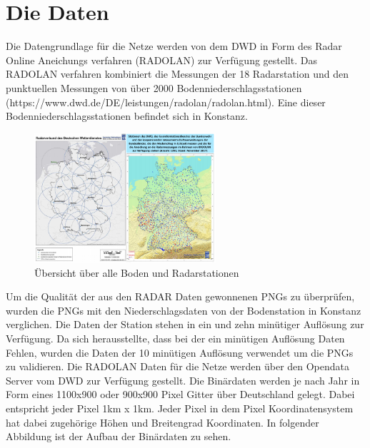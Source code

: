 \section{Die Daten}\label{die daten}
Die Datengrundlage für die Netze werden von dem DWD in Form des Radar Online Aneichungs verfahren (RADOLAN) zur Verfügung gestellt. Das RADOLAN verfahren kombiniert die Messungen der 18 Radarstation und den punktuellen Messungen von über 2000 Bodenniederschlagsstationen (https://www.dwd.de/DE/leistungen/radolan/radolan.html). Eine dieser Bodenniederschlagsstationen befindet sich in Konstanz. 

\begin{figure}[htb]
 \centering
 \includegraphics[width=0.6\textwidth,angle=0]{abb/daten_stationsuebersicht}
 \caption[Stationen Übersicht]{Übersicht über alle Boden und Radarstationen}
\label{fig:daten_stationsuebersicht}
\end{figure}

Um die Qualität der aus den RADAR Daten gewonnenen PNGs zu überprüfen, wurden die PNGs mit den Niederschlagsdaten von der Bodenstation in Konstanz verglichen. Die Daten der Station stehen in ein und zehn minütiger Auflösung zur Verfügung. Da sich herausstellte, dass bei der ein minütigen Auflösung Daten Fehlen, wurden die Daten der 10 minütigen Auflösung verwendet um die PNGs zu validieren. 
Die RADOLAN Daten für die Netze werden über den Opendata Server vom DWD zur Verfügung gestellt. Die Binärdaten werden je nach Jahr in Form eines 1100x900 oder 900x900 Pixel Gitter über Deutschland gelegt.  Dabei entspricht jeder Pixel 1km x 1km. Jeder Pixel in dem Pixel Koordinatensystem hat dabei zugehörige Höhen und Breitengrad Koordinaten. In folgender Abbildung ist der Aufbau der Binärdaten zu sehen.


